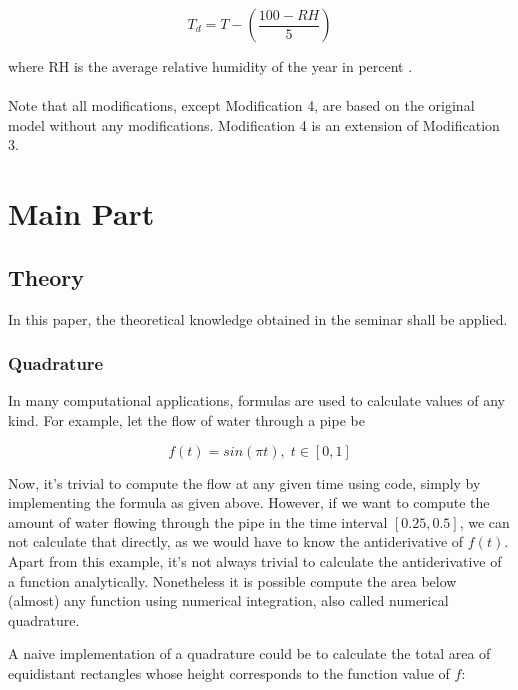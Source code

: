 \documentclass[12pt, a4paper, oneside]{article}
\begin{document}
\begin{equation}
	{T_d} = T - (\frac{100 - RH}{5})
\end{equation}

where RH is the average relative humidity of the year in percent \citep{lawrence2005relationship}.\\\\


Note that all modifications, except Modification 4, are based on the original model without any modifications.
Modification 4 is an extension of Modification 3. 

	
	\section{Main Part}
	\subsection{Theory}
	
	In this paper, the theoretical knowledge obtained in the seminar shall be applied. 
	
	\subsubsection{Quadrature}
	In many computational applications, formulas 	are used to calculate values of any kind. For example, let the flow of water through a pipe be 

	\begin{equation}
	f(t) = sin(\pi t), \; t \in [0,1]
	\end{equation}

Now, it's trivial to compute the flow at any given time using code, simply by implementing the formula as given above. 
However, if we want to compute the amount of water flowing through the pipe in the time interval $[0.25, 0.5]$, we can not calculate that directly, as we would have to know the antiderivative of $f(t)$. 
Apart from this example, it's not always trivial to calculate the antiderivative of a function analytically. 
Nonetheless it is possible compute the area below (almost) any function using numerical integration, also called numerical quadrature. 

A naive implementation of a quadrature could be to calculate the total area of equidistant rectangles whose height corresponds to the function value of $f$: 
\end{document}
